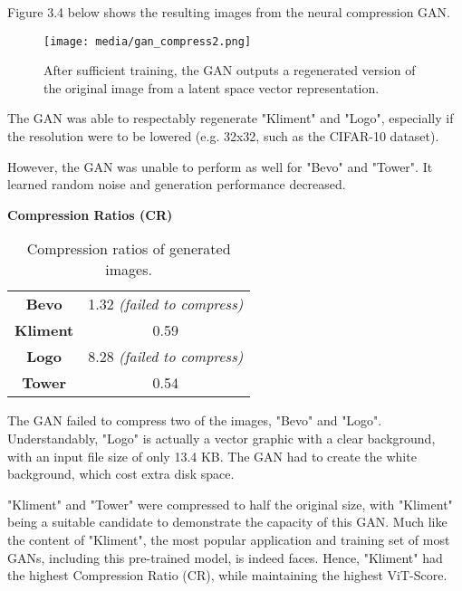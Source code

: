 Figure 3.4 below shows the resulting images from the neural compression GAN.

\begin{figure}[H]
	\begin{center}
	\texttt{[image: media/gan\_compress2.png]}
	\end{center}
	\caption[Neural Compression and Generation]{After sufficient training, the GAN outputs a regenerated
    version of the original image from a latent space vector representation.}
	\end{figure}

\vspace{5mm}   


The GAN was able to respectably regenerate "Kliment" and "Logo", especially if the resolution
were to be lowered (e.g. 32x32, such as the CIFAR-10 dataset).

However, the GAN was unable to perform as well for "Bevo" and "Tower".
It learned random noise and generation performance decreased.


\textbf{Compression Ratios (CR)}

\begin{table}[H]
\begin{center}
\begin{tabular}{|c|c|}
\hline
\textbf{Bevo}	& 1.32 \textit{(failed to compress)}\\
\textbf{Kliment}	& 0.59\\
\textbf{Logo}	& 8.28 \textit{(failed to compress)}\\
\textbf{Tower} & 0.54\\\hline

\end{tabular}
\caption[Results: Compression Ratios]{Compression ratios of generated images.}
\end{center}
\end{table}

The GAN failed to compress two of the images, "Bevo" and "Logo". Understandably,
"Logo" is actually a vector graphic with a clear background, with an input file size of only 13.4 KB.
The GAN had to create the white background, which cost extra disk space.

"Kliment" and "Tower" were compressed to half the original size, with "Kliment"
being a suitable candidate to demonstrate the capacity of this GAN.
Much like the content of "Kliment", the most popular application and training set of most GANs, including this pre-trained model,
is indeed faces. Hence, "Kliment" had the highest Compression Ratio (CR), while maintaining the highest ViT-Score.


